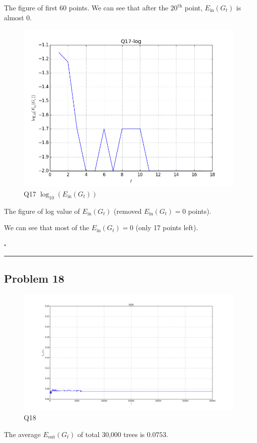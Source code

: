 \documentclass[12pt]{article}
\newcommand*{\QEDB}{\hfill\ensuremath{\square}}
\newcommand{\ParTh}[1]{\left(#1\right)}
\newcommand{\horrule}[1]{\rule{\linewidth}{#1}}
\begin{document}
The figure of first 60 points. We can see that after the ${20}^{\text{th}}$ point, $E_{\text{in}}\ParTh{G_t}$ is almost 0.
\begin{figure}[H]
	\centering
	\includegraphics[scale=0.6]{Q17-log.png}
	\caption{Q17 $\log_{10}\ParTh{E_{\text{in}}\ParTh{G_t}}$}
	\label{Q17-log}
\end{figure}
The figure of log value of $E_{\text{in}}\ParTh{G_t}$ (removed $E_{\text{in}}\ParTh{G_t}=0$ points).

We can see that most of the $E_{\text{in}}\ParTh{G_t}=0$ (only 17 points left).

\QEDB

\horrule{0.5pt}

\subsection*{Problem 18}

\begin{figure}[H]
	\centering
	\includegraphics[scale=0.3]{Q18.png}
	\caption{Q18}
	\label{Q18}
\end{figure}
The average $E_{\text{out}}\ParTh{G_t}$ of total 30,000 trees is $0.0753$.
\end{document}
